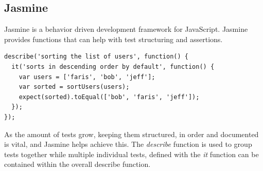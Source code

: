 \subsection{Jasmine}
Jasmine is a behavior driven development framework for JavaScript. Jasmine provides functions that can help with test structuring and assertions. 

\begin{lstlisting}[caption=Test Definition with Jasmine]
describe('sorting the list of users', function() {
  it('sorts in descending order by default', function() {
    var users = ['faris', 'bob', 'jeff'];
    var sorted = sortUsers(users);
    expect(sorted).toEqual(['bob', 'faris', 'jeff']);
  });
});
\end{lstlisting}

As the amount of tests grow, keeping them structured, in order and documented is vital, and Jasmine helps achieve this. The \textit{describe} function is used to group tests together while multiple individual tests, defined with the \textit{it} function can be contained within the overall describe function.

